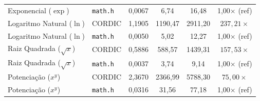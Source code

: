 \begin{table}[htbp]
{\begin{tabular}{llcccc}
Exponencial ($\exp$) & \texttt{math.h} & 0,0067 & 6,74 & 16,48 & 1{,}00$\times$ (ref) \\
Logaritmo Natural ($\ln$) & CORDIC & 1,1905 & 1190,47 & 2911,20 & $237,21\times$ \\
Logaritmo Natural ($\ln$) & \texttt{math.h} & 0,0050 & 5,02 & 12,27 & 1{,}00$\times$ (ref) \\
Raiz Quadrada ($\sqrt{x}$) & CORDIC & 0,5886 & 588,57 & 1439,31 & $157,53\times$ \\
Raiz Quadrada ($\sqrt{x}$) & \texttt{math.h} & 0,0037 & 3,74 & 9,14 & 1{,}00$\times$ (ref) \\
Potenciação ($x^y$) & CORDIC & 2,3670 & 2366,99 & 5788,30 & $75,00\times$ \\
Potenciação ($x^y$) & \texttt{math.h} & 0,0316 & 31,56 & 77,18 & 1{,}00$\times$ (ref) \\
\hline
\end{tabular}%
}
\end{table}